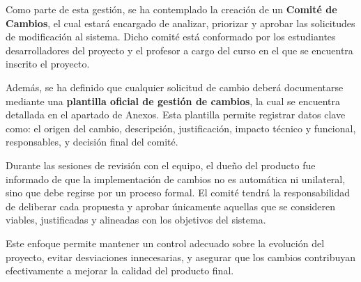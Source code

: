 Como parte de esta gestión, se ha contemplado la creación de un \textbf{Comité de
	Cambios}, el cual estará encargado de analizar, priorizar y aprobar las solicitudes de
modificación al sistema. Dicho comité está conformado por los estudiantes desarrolladores
del proyecto y el profesor a cargo del curso en el que se encuentra inscrito el proyecto.

Además, se ha definido que cualquier solicitud de cambio deberá documentarse mediante
una \textbf{plantilla oficial de gestión de cambios}, la cual se encuentra detallada
en el apartado de Anexos. Esta plantilla permite registrar datos clave como: el origen
del cambio, descripción, justificación, impacto técnico y funcional, responsables, y
decisión final del comité.

Durante las sesiones de revisión con el equipo, el dueño del producto fue informado
de que la implementación de cambios no es automática ni unilateral, sino que debe regirse
por un proceso formal. El comité tendrá la responsabilidad de deliberar cada propuesta
y aprobar únicamente aquellas que se consideren viables, justificadas y alineadas con
los objetivos del sistema.

Este enfoque permite mantener un control adecuado sobre la evolución del proyecto,
evitar desviaciones innecesarias, y asegurar que los cambios contribuyan efectivamente
a mejorar la calidad del producto final.
